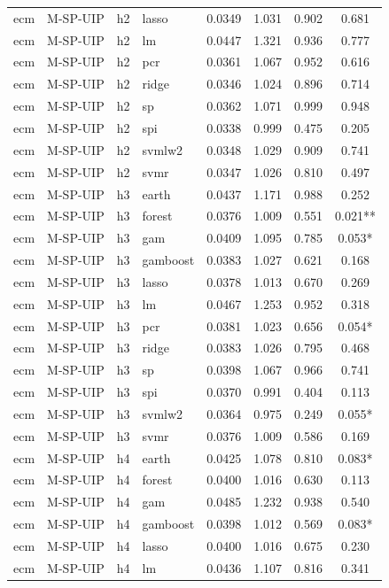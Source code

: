 \begin{ThreePartTable}
\begin{longtable}[t]{llclcccc}
ecm & M-SP-UIP & h2 & lasso & 0.0349 & 1.031 & 0.902 & 0.681\\
ecm & M-SP-UIP & h2 & lm & 0.0447 & 1.321 & 0.936 & 0.777\\
ecm & M-SP-UIP & h2 & pcr & 0.0361 & 1.067 & 0.952 & 0.616\\
ecm & M-SP-UIP & h2 & ridge & 0.0346 & 1.024 & 0.896 & 0.714\\
ecm & M-SP-UIP & h2 & sp & 0.0362 & 1.071 & 0.999 & 0.948\\
ecm & M-SP-UIP & h2 & spi & 0.0338 & 0.999 & 0.475 & 0.205\\
ecm & M-SP-UIP & h2 & svmlw2 & 0.0348 & 1.029 & 0.909 & 0.741\\
ecm & M-SP-UIP & h2 & svmr & 0.0347 & 1.026 & 0.810 & 0.497\\
\addlinespace
ecm & M-SP-UIP & h3 & earth & 0.0437 & 1.171 & 0.988 & 0.252\\
ecm & M-SP-UIP & h3 & forest & 0.0376 & 1.009 & 0.551 & 0.021**\\
ecm & M-SP-UIP & h3 & gam & 0.0409 & 1.095 & 0.785 & 0.053*\\
ecm & M-SP-UIP & h3 & gamboost & 0.0383 & 1.027 & 0.621 & 0.168\\
ecm & M-SP-UIP & h3 & lasso & 0.0378 & 1.013 & 0.670 & 0.269\\
ecm & M-SP-UIP & h3 & lm & 0.0467 & 1.253 & 0.952 & 0.318\\
ecm & M-SP-UIP & h3 & pcr & 0.0381 & 1.023 & 0.656 & 0.054*\\
ecm & M-SP-UIP & h3 & ridge & 0.0383 & 1.026 & 0.795 & 0.468\\
ecm & M-SP-UIP & h3 & sp & 0.0398 & 1.067 & 0.966 & 0.741\\
ecm & M-SP-UIP & h3 & spi & 0.0370 & 0.991 & 0.404 & 0.113\\
ecm & M-SP-UIP & h3 & svmlw2 & 0.0364 & 0.975 & 0.249 & 0.055*\\
ecm & M-SP-UIP & h3 & svmr & 0.0376 & 1.009 & 0.586 & 0.169\\
\addlinespace
ecm & M-SP-UIP & h4 & earth & 0.0425 & 1.078 & 0.810 & 0.083*\\
ecm & M-SP-UIP & h4 & forest & 0.0400 & 1.016 & 0.630 & 0.113\\
ecm & M-SP-UIP & h4 & gam & 0.0485 & 1.232 & 0.938 & 0.540\\
ecm & M-SP-UIP & h4 & gamboost & 0.0398 & 1.012 & 0.569 & 0.083*\\
ecm & M-SP-UIP & h4 & lasso & 0.0400 & 1.016 & 0.675 & 0.230\\
ecm & M-SP-UIP & h4 & lm & 0.0436 & 1.107 & 0.816 & 0.341\\

\end{longtable}
\end{ThreePartTable}
